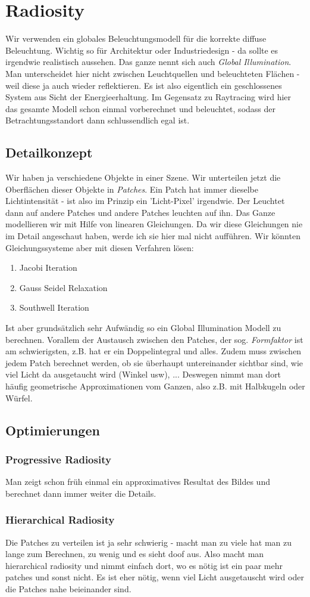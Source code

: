 \chapter{Radiosity}
Wir verwenden ein globales Beleuchtungsmodell für die korrekte diffuse Beleuchtung. Wichtig so für Architektur oder Industriedesign - da sollte es irgendwie realistisch aussehen. Das ganze nennt sich auch \textit{Global Illumination}. Man unterscheidet hier nicht zwischen Leuchtquellen und beleuchteten Flächen - weil diese ja auch wieder reflektieren. Es ist also eigentlich ein geschlossenes System aus Sicht der Energieerhaltung. Im Gegensatz zu Raytracing wird hier das gesamte Modell schon einmal vorberechnet und beleuchtet, sodass der Betrachtungsstandort dann schlussendlich egal ist.
\section{Detailkonzept}
Wir haben ja verschiedene Objekte in einer Szene. Wir unterteilen jetzt die Oberflächen dieser Objekte in \textit{Patches}. Ein Patch hat immer dieselbe Lichtintensität - ist also im Prinzip ein 'Licht-Pixel' irgendwie. Der Leuchtet dann auf andere Patches und andere Patches leuchten auf ihn. Das Ganze modellieren wir mit Hilfe von linearen Gleichungen. Da wir diese Gleichungen nie im Detail angeschaut haben, werde ich sie hier mal nicht aufführen. Wir könnten Gleichungssysteme aber mit diesen Verfahren lösen:
\begin{enumerate}
	\item Jacobi Iteration
	\item Gauss Seidel Relaxation
	\item Southwell Iteration
\end{enumerate}
Ist aber grundsätzlich sehr Aufwändig so ein Global Illumination Modell zu berechnen. Vorallem der Austausch zwischen den Patches, der sog. \textit{Formfaktor} ist am schwierigsten, z.B. hat er ein Doppelintegral und alles. Zudem muss zwischen jedem Patch berechnet werden, ob sie überhaupt untereinander sichtbar sind, wie viel Licht da ausgetaucht wird (Winkel usw), ... Deswegen nimmt man dort häufig geometrische Approximationen vom Ganzen, also z.B. mit Halbkugeln oder Würfel.

\section{Optimierungen}	
\subsection{Progressive Radiosity}
Man zeigt schon früh einmal ein approximatives Resultat des Bildes und berechnet dann immer weiter die Details.
\subsection{Hierarchical Radiosity}
Die Patches zu verteilen ist ja sehr schwierig - macht man zu viele hat man zu lange zum Berechnen, zu wenig und es sieht doof aus. Also macht man hierarchical radiosity und nimmt einfach dort, wo es nötig ist ein paar mehr patches und sonst nicht. Es ist eher nötig, wenn viel Licht ausgetauscht wird oder die Patches nahe beieinander sind.